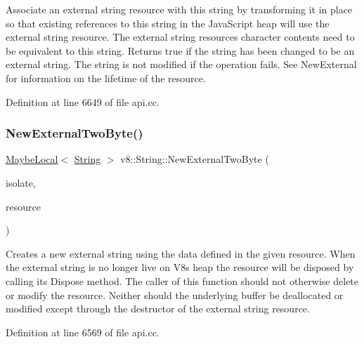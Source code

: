 Associate an external string resource with this string by transforming it in place so that existing references to this string in the Java\+Script heap will use the external string resource. The external string resource\textquotesingle{}s character contents need to be equivalent to this string. Returns true if the string has been changed to be an external string. The string is not modified if the operation fails. See New\+External for information on the lifetime of the resource. 

Definition at line 6649 of file api.\+cc.

\mbox{\label{classv8_1_1String_a31979e3688dfeab2f74b90a1bec50f9b}} 
\subsubsection{\texorpdfstring{New\+External\+Two\+Byte()}{NewExternalTwoByte()}}
{\footnotesize\ttfamily \mbox{\hyperlink{classv8_1_1MaybeLocal}{Maybe\+Local}}$<$ \mbox{\hyperlink{classv8_1_1String}{String}} $>$ v8\+::\+String\+::\+New\+External\+Two\+Byte (\begin{DoxyParamCaption}\item[{Isolate $\ast$}]{isolate,  }\item[{\mbox{\hyperlink{classv8_1_1String_1_1ExternalStringResource}{External\+String\+Resource}} $\ast$}]{resource }\end{DoxyParamCaption})\hspace{0.3cm}{\ttfamily [static]}}

Creates a new external string using the data defined in the given resource. When the external string is no longer live on V8\textquotesingle{}s heap the resource will be disposed by calling its Dispose method. The caller of this function should not otherwise delete or modify the resource. Neither should the underlying buffer be deallocated or modified except through the destructor of the external string resource. 

Definition at line 6569 of file api.\+cc.

\mbox{\label{classv8_1_1String_ac9e61b74b58ad14389882c5030843972}} 
